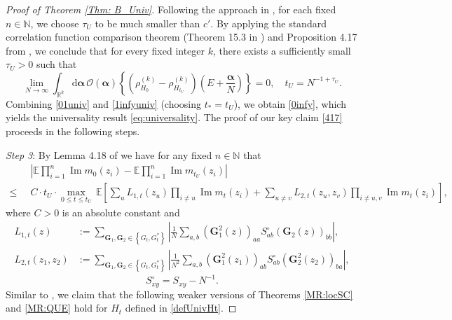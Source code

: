 \documentclass[10pt,reqno]{article}
\theoremstyle{plain} %
\theoremstyle{remark}
\numberwithin{equation}{section}
\begin{document}
\begin{proof}[Proof of Theorem \ref{Thm: B_Univ}]
Following the approach in \cite{Xu:2024aa}, for each fixed $n \in \mathbb{N}$, we choose $\tau_U$ to be much smaller than $c'$. By applying the standard correlation function comparison theorem (Theorem 15.3 in \cite{erdHos2017dynamical}) and Proposition 4.17 from \cite{Xu:2024aa}, we conclude that for every fixed integer $k$, there exists a sufficiently small $\tau_U>0$ such that
\begin{equation}\label{01univ}
\lim_{N \rightarrow \infty} \int_{\mathbb{R}^k} \mathrm{d}\boldsymbol{\alpha}\,\mathcal{O}(\boldsymbol{\alpha})\left\{\left(\rho_{H_0}^{(k)}-\rho_{H_{t_U}}^{(k)}\right)\left(E+\frac{\boldsymbol{\alpha}}{N}\right)\right\}=0, \quad t_U=N^{-1+\tau_U}.
\end{equation}
Combining \eqref{01univ} and \eqref{1infyuniv} (choosing $t_*=t_U$), we obtain \eqref{0infy}, which yields the universality result \eqref{eq:universality}. The proof of our key claim \eqref{417} proceeds in the following steps.

\medskip 
\noindent 
\emph{Step 3}: %
By Lemma 4.18 of \cite{Xu:2024aa} we have for any fixed $n \in \mathbb{N}$ that
\begin{align}\label{EMCTE}
\; &\;   \left|\mathbb{E} \prod_{i=1}^n \operatorname{Im} m_0\left(z_i\right)-\mathbb{E} \prod_{i=1}^n \operatorname{Im} m_{t_U}\left(z_i\right)\right|
\\\nonumber
 \leq \; &\; C\cdot t_U\cdot \max_{0\le t\le t_U}\,\mathbb{E}\left[\sum_u L_{1, t}\left(z_u\right) \prod_{i \neq u} \operatorname{Im} m_t\left(z_i\right)+\sum_{u \neq v} L_{2, t}\left(z_u, z_v\right) \prod_{i \neq u, v} \operatorname{Im} m_t\left(z_i\right)\right],
\end{align}
where  $C>0$ is an absolute constant and 
$$
\begin{aligned}
L_{1, t}(z) & :=\sum_{\mathbf{G}_1, \mathbf{G}_2 \in\left\{G_t, G_t^*\right\}}\left|\frac{1}{N} \sum_{a, b}\left(\mathbf{G}_1^2(z)\right)_{a a} S_{a b}^{\circ}\left(\mathbf{G}_2(z)\right)_{b b}\right|, \\
L_{2, t}\left(z_1, z_2\right) & :=\sum_{\mathbf{G}_1, \mathbf{G}_2 \in\left\{G_t, G_t^*\right\}}\left|\frac{1}{N^2} \sum_{a, b}\left(\mathbf{G}_1^2\left(z_1\right)\right)_{a b} S_{a b}^{\circ}\left(\mathbf{G}_2^2\left(z_2\right)\right)_{b a}\right| , 
\end{aligned}
$$
$$
S_{xy}^{\circ}=S_{xy}-N^{-1}.
$$
Similar to \cite{Xu:2024aa}, we claim that the following weaker versions of Theorems \ref{MR:locSC} and \ref{MR:QUE} hold for $H_t$ defined in \eqref{defUnivHt}.


\end{proof}
\end{document}
